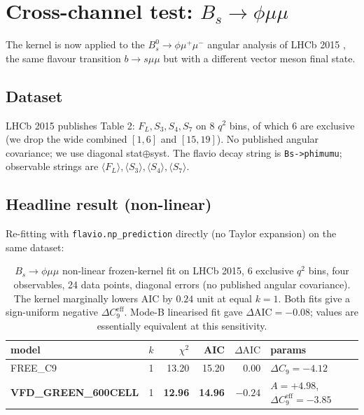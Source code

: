 \section{Cross-channel test: $B_{s}\to\phi\mu\mu$}\label{sec:cross-channel}

The kernel is now applied to the $B_{s}^{0}\to\phi\mu^{+}\mu^{-}$
angular analysis of LHCb 2015 \citep{LHCb2015Bsphimumu,
LHCb2015BsphiHEPData}, the same flavour transition $b\to s\mu\mu$ but
with a different vector meson final state.

\subsection{Dataset}

LHCb 2015 publishes Table 2: $F_{L}, S_{3}, S_{4}, S_{7}$ on 8 $q^{2}$
bins, of which 6 are exclusive (we drop the wide combined $[1, 6]$
and $[15, 19]$). No published angular covariance; we use diagonal
stat$\oplus$syst. The flavio decay string is \texttt{Bs->phimumu};
observable strings are $\langle F_{L}\rangle, \langle S_{3}\rangle,
\langle S_{4}\rangle, \langle S_{7}\rangle$.

\subsection{Headline result (non-linear)}

Re-fitting with \texttt{flavio.np\_prediction} directly (no Taylor
expansion) on the same dataset:

\begin{table}[h]
\centering
\small
\setlength{\tabcolsep}{4pt}
\begin{tabular}{lcrrrl}
\toprule
model & $k$ & $\chi^{2}$ & AIC & $\Delta\mathrm{AIC}$ & params \\
\midrule
FREE\_C9        & 1 & 13.20 & 15.20 & $0.00$  & $\Delta C_{9}=-4.12$ \\
\textbf{VFD\_GREEN\_600CELL} & 1 & \textbf{12.96} & \textbf{14.96} & $\boldsymbol{-0.24}$ & $A=+4.98$, $\Delta C_{9}^{\mathrm{eff}}=-3.85$ \\
\bottomrule
\end{tabular}
\caption{$B_{s}\to\phi\mu\mu$ non-linear frozen-kernel fit on LHCb 2015,
6 exclusive $q^{2}$ bins, four observables, 24 data points, diagonal
errors (no published angular covariance). The kernel marginally lowers
AIC by $0.24$ unit at equal $k=1$. Both fits give a sign-uniform
negative $\Delta C_{9}^{\mathrm{eff}}$. Mode-B linearised fit gave
$\Delta\mathrm{AIC}=-0.08$; values are essentially equivalent at this
sensitivity.}
\label{tab:bs_phi_main}
\end{table}

